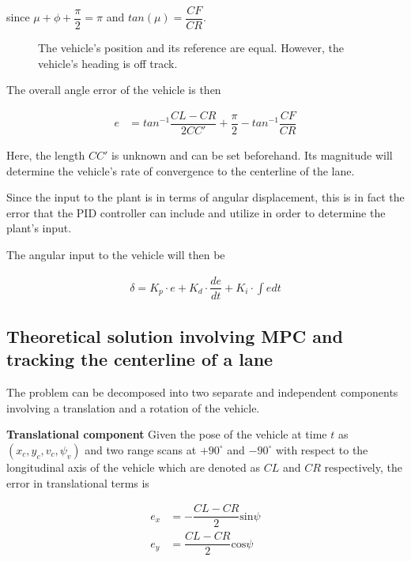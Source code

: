 \documentclass[oneside,12pt]{article}
\begin{document}
    since $\mu + \phi + \dfrac{\pi}{2} = \pi$ and $tan(\mu) = \dfrac{CF}{CR}$.

    \begin{figure}[H]\centering
      \scalebox{1}{}
      \caption{The vehicle's position and its reference are equal. However,
        the vehicle's heading is off track.}
      \label{}
    \end{figure}

    The overall angle error of the vehicle is then

    \begin{align}
      e &= tan^{-1}\dfrac{CL-CR}{2CC'} + \dfrac{\pi}{2} - tan^{-1}\dfrac{CF}{CR}
    \end{align}

    Here, the length $CC'$ is unknown and can be set beforehand. Its magnitude
    will determine the vehicle's rate of convergence to the centerline of the
    lane.

    Since the input to the plant is in terms of angular displacement, this
    is in fact the error that the PID controller can include and utilize in
    order to determine the plant's input.

    The angular input to the vehicle will then be

    \begin{align}
      \delta = K_p \cdot e + K_d \cdot \dfrac{de}{dt} + K_i \cdot \int e dt
    \end{align}




  \subsection{Theoretical solution involving MPC and tracking the centerline of a lane}

    The problem can be decomposed into two separate and independent
    components involving a translation and a rotation of the vehicle.


    \textbf{Translational component} Given the pose of the vehicle at time $t$
    as $(x_c, y_c, v_c, \psi_v)$ and two range scans at $+90^\circ$ and
    $-90^\circ$ with respect to the longitudinal axis of the vehicle which are
    denoted as $CL$ and $CR$ respectively, the error in translational terms is

    \begin{align}
      e_x &= -\dfrac{CL-CR}{2}\text{sin}\psi \\
      e_y &= \dfrac{CL-CR}{2}\text{cos}\psi
    \end{align}
\end{document}
